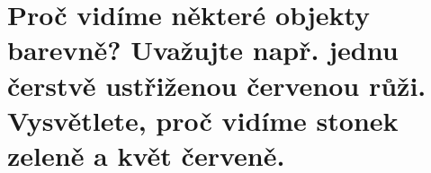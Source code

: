 \section{Proč vidíme některé objekty barevně? Uvažujte např. jednu čerstvě ustřiženou červenou růži. Vysvětlete, proč 
vidíme stonek zeleně a květ červeně.}